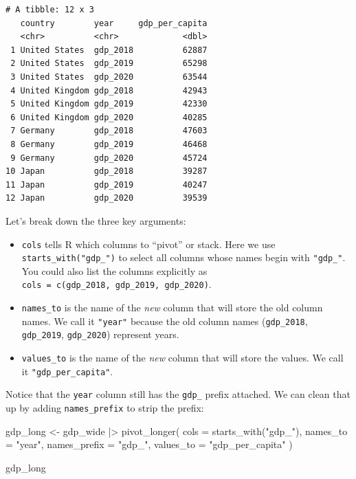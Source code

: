 \documentclass[
  letterpaper,
  DIV=11,
  numbers=noendperiod]{scrreprt}
\newenvironment{Shaded}{\begin{snugshade}}{\end{snugshade}}
\newcommand{\AttributeTok}[1]{\textcolor[rgb]{0.40,0.45,0.13}{#1}}
\newcommand{\FunctionTok}[1]{\textcolor[rgb]{0.28,0.35,0.67}{#1}}
\newcommand{\NormalTok}[1]{\textcolor[rgb]{0.00,0.23,0.31}{#1}}
\newcommand{\OtherTok}[1]{\textcolor[rgb]{0.00,0.23,0.31}{#1}}
\newcommand{\SpecialCharTok}[1]{\textcolor[rgb]{0.37,0.37,0.37}{#1}}
\newcommand{\StringTok}[1]{\textcolor[rgb]{0.13,0.47,0.30}{#1}}
\providecommand{\tightlist}{%
  \setlength{\itemsep}{0pt}\setlength{\parskip}{0pt}}
\begin{document}
\begin{verbatim}
# A tibble: 12 x 3
   country        year     gdp_per_capita
   <chr>          <chr>             <dbl>
 1 United States  gdp_2018          62887
 2 United States  gdp_2019          65298
 3 United States  gdp_2020          63544
 4 United Kingdom gdp_2018          42943
 5 United Kingdom gdp_2019          42330
 6 United Kingdom gdp_2020          40285
 7 Germany        gdp_2018          47603
 8 Germany        gdp_2019          46468
 9 Germany        gdp_2020          45724
10 Japan          gdp_2018          39287
11 Japan          gdp_2019          40247
12 Japan          gdp_2020          39539
\end{verbatim}

Let's break down the three key arguments:

\begin{itemize}
\tightlist
\item
  \texttt{cols} tells R which columns to ``pivot'' or stack. Here we use
  \texttt{starts\_with("gdp\_")} to select all columns whose names begin
  with \texttt{"gdp\_"}. You could also list the columns explicitly as
  \texttt{cols\ =\ c(gdp\_2018,\ gdp\_2019,\ gdp\_2020)}.
\item
  \texttt{names\_to} is the name of the \emph{new} column that will
  store the old column names. We call it \texttt{"year"} because the old
  column names (\texttt{gdp\_2018}, \texttt{gdp\_2019},
  \texttt{gdp\_2020}) represent years.
\item
  \texttt{values\_to} is the name of the \emph{new} column that will
  store the values. We call it \texttt{"gdp\_per\_capita"}.
\end{itemize}

Notice that the \texttt{year} column still has the \texttt{gdp\_} prefix
attached. We can clean that up by adding \texttt{names\_prefix} to strip
the prefix:

\begin{Shaded}
\begin{Highlighting}[]
\NormalTok{gdp\_long }\OtherTok{\textless{}{-}}\NormalTok{ gdp\_wide }\SpecialCharTok{|\textgreater{}}
  \FunctionTok{pivot\_longer}\NormalTok{(}
    \AttributeTok{cols =} \FunctionTok{starts\_with}\NormalTok{(}\StringTok{"gdp\_"}\NormalTok{),}
    \AttributeTok{names\_to =} \StringTok{"year"}\NormalTok{,}
    \AttributeTok{names\_prefix =} \StringTok{"gdp\_"}\NormalTok{,}
    \AttributeTok{values\_to =} \StringTok{"gdp\_per\_capita"}
\NormalTok{  )}

\NormalTok{gdp\_long}
\end{Highlighting}
\end{Shaded}
\end{document}
